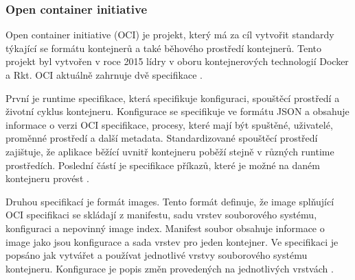 \subsubsection{Open container initiative}
Open container initiative (OCI) je projekt, který má za cíl vytvořit standardy týkající se formátu kontejnerů a také běhového prostředí kontejnerů. Tento projekt byl vytvořen v roce 2015 lídry v oboru kontejnerových technologií Docker a Rkt. OCI aktuálně zahrnuje dvě specifikace \cite{oci}. \par
První je runtime specifikace, která specifikuje konfiguraci, spouštěcí prostředí a \linebreak životní cyklus kontejneru. Konfigurace se specifikuje ve formátu JSON a obsahuje informace o verzi OCI specifikace, procesy, které mají být spuštěné, uživatelé, proměnné prostředí a další metadata. Standardizované spouštěcí prostředí zajištuje, že aplikace běžící uvnitř kontejneru poběží stejně v různých runtime prostředích. Poslední částí je specifikace příkazů, které je možné na daném kontejneru provést \cite{runtimespec}.\par
Druhou specifikací je formát images. Tento formát definuje, že image splňující OCI specifikaci se skládají z manifestu, sadu vrstev souborového systému, konfiguraci a \linebreak nepovinný image index. Manifest soubor obsahuje informace o image jako jsou \linebreak konfigurace a sada vrstev pro jeden kontejner. Ve specifikaci je popsáno jak vytvářet a používat jednotlivé vrstvy souborového systému kontejneru. Konfigurace je popis změn provedených na jednotlivých vrstvách \cite{imagespec}. 

